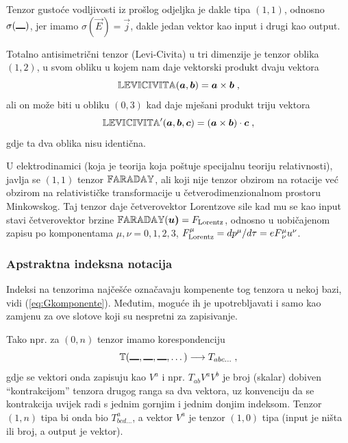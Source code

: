 Tenzor gustoće vodljivosti iz prošlog odjeljka je dakle
tipa $(1,1)$, odnosno $\sigma(\slot)$, jer imamo
$\sigma(\vec{E}) = \vec{j}$, dakle jedan vektor kao input
i drugi kao output.

Totalno antisimetrični tenzor (Levi-Civita) u tri dimenzije je
tenzor oblika $(1, 2)$, u svom obliku u kojem nam daje
vektorski produkt dvaju vektora
\begin{equation}
   \bbtensor{LEVICIVITA}(\vec{a}, \vec{b}) = \vec{a}\times\vec{b} \;,
\end{equation}
ali on može biti u obliku $(0, 3)$ kad daje mješani produkt 
triju vektora
\begin{equation}
   \bbtensor{LEVICIVITA}'(\vec{a}, \vec{b}, \vec{c}) =
 (\vec{a}\times\vec{b})\cdot\vec{c} \;,
\end{equation}
gdje ta dva oblika nisu identična.

U elektrodinamici (koja je teorija koja poštuje specijalnu teoriju
relativnosti), javlja se $(1,1)$ tenzor $\mathbb{FARADAY}$, ali koji
nije tenzor obzirom na rotacije
već obzirom na relativističke transformacije u četverodimenzionalnom
prostoru Minkowskog. Taj tenzor daje četverovektor Lorentzove sile
kad mu se kao input stavi četverovektor brzine
$\bbtensor{FARADAY}(\vec{u)} = F_{\rm Lorentz}$, odnosno u uobičajenom
zapisu po komponentama $\mu, \nu = 0,1,2,3$, 
$F^{\mu}_{\rm Lorentz} = d p^{\mu}/d\tau = e F^{\mu}_{\,\nu} u^\nu$.


\subsubsection*{Apstraktna indeksna notacija}

Indeksi na tenzorima najčešće označavaju kompenente tog tenzora
u nekoj bazi, vidi (\ref{eq:Gkomponente}). Međutim, moguće ih
je upotrebljavati i samo kao zamjenu za ove slotove koji su
nespretni za zapisivanje.

Tako npr.  za $(0, n)$ tenzor imamo korespondenciju
\begin{equation}
\bbtensor{T}(\slot,\slot,\slot, \dots)  \longrightarrow T_{abc\dots} \;,
\end{equation}
gdje se vektori onda zapisuju kao $V^a$ i npr.  $T_{ab}V^{a}V^{b}$ je
broj (skalar) dobiven ``kontrakcijom'' tenzora drugog ranga sa
dva vektora, uz konvenciju da se kontrakcija uvijek radi s jednim
gornjim i jednim donjim indeksom. Tenzor $(1,n)$ tipa bi onda bio
$T^{a}_{bcd\dots}$, a vektor $V^a$ je tenzor $(1,0)$ tipa (input
je ništa ili broj, a output je vektor).

